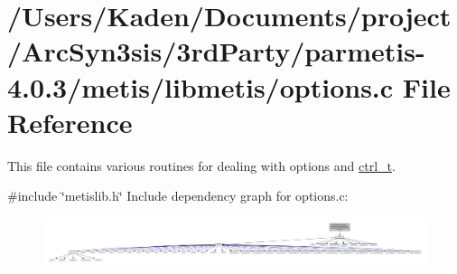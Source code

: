 \hypertarget{a00254}{}\section{/\+Users/\+Kaden/\+Documents/project/\+Arc\+Syn3sis/3rd\+Party/parmetis-\/4.0.3/metis/libmetis/options.c File Reference}
\label{a00254}


This file contains various routines for dealing with options and \hyperlink{a00742}{ctrl\+\_\+t}.  


{\ttfamily \#include \char`\"{}metislib.\+h\char`\"{}}\newline
Include dependency graph for options.\+c\+:\nopagebreak
\begin{figure}[H]
\begin{center}
\leavevmode
\includegraphics[width=350pt]{a00255}
\end{center}
\end{figure}

